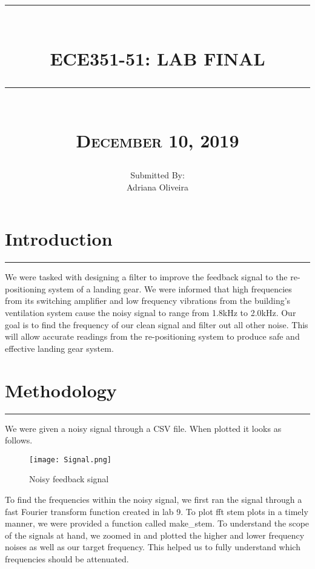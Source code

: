\documentclass[12pt]{report}
\newcommand{\HRule}[1]{\rule{\linewidth}{#1}}
\begin{document}
\title{ 
		\\ [2.0cm]
		\HRule{0.5pt} \\
		\LARGE \textbf{\uppercase{ECE351-51: Lab Final}} 
		\HRule{2pt} \\ [0.5cm]
		\normalsize\textsc{December 10, 2019} \vspace*{5\baselineskip}}

\date{}
\author{\normalsize
		Submitted By: \\
		\normalsize Adriana Oliveira\\}

\maketitle

\newpage

\sectionfont{\scshape}
\section*{Introduction}
\hrule
\vspace{1cm}
\setlength{\parindent}{5ex}
We were tasked with designing a filter to improve the feedback signal to the re-positioning system of a landing gear. We were informed that high frequencies from  its switching amplifier and low frequency vibrations from the building’s ventilation system cause the noisy signal to range from 1.8kHz to 2.0kHz. Our goal is to find the frequency of our clean signal and filter out all other noise. This will allow accurate readings from the re-positioning system to produce safe and effective landing gear system. 
 \par
 
\section*{Methodology}
\hrule
\vspace{1cm}
\setlength{\parindent}{5ex}
\sectionfont{\scshape}

We were given a noisy signal through a CSV file. When plotted it looks as follows. 

\begin{figure}[h!]
    \centering
    \texttt{[image: Signal.png]}
    \caption{Noisy feedback signal}
    \label{fig:my_label}
\end{figure}

\newpage
To find the frequencies within the noisy signal, we first ran the signal through a fast Fourier transform function created in lab 9. To plot fft stem plots in a timely manner, we were provided a function called make\_stem. To understand the scope of the signals at hand, we zoomed in and plotted the higher and lower frequency noises as well as our target frequency. This helped us to fully understand which frequencies should be attenuated.\par 
\end{document}
